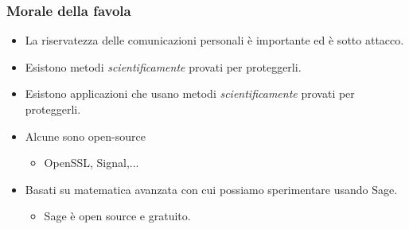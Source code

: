 \documentclass[]{beamer}
\begin{document}
\begin{frame}
\frametitle{Morale della favola}
\pause
\begin{itemize}
\color{purple}
\item La riservatezza delle comunicazioni personali \`e importante ed \`e sotto attacco.
\pause
\item Esistono metodi {\em scientificamente} provati per proteggerli.
\pause
\item Esistono applicazioni che usano metodi {\em scientificamente} provati per proteggerli.
\pause
\item Alcune sono open-source
\begin{itemize}
\color{teal}
\item OpenSSL, Signal,...
\end{itemize}
\pause
\item Basati su matematica avanzata con cui possiamo sperimentare usando Sage.
\pause
\begin{itemize}
\color{teal}
\item Sage \`e open source e gratuito.
\end{itemize}
\end{itemize}
\end{frame}
\end{document}
